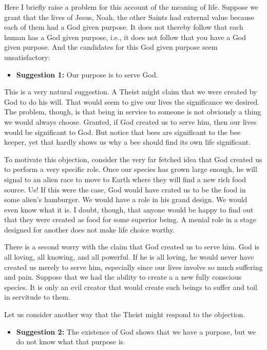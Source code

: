 \documentclass[]{article}
\begin{document}
Here I briefly raise a problem for this account of the meaning of life.
Suppose we grant that the lives of Jesus, Noah, the other Saints had
external value because each of them had a God given purpose. It does not
thereby follow that each human has a God given purpose, i.e., it does
not follow that you have a God given purpose. And the candidates for
this God given purpose seem unsatisfactory:

\begin{itemize}
\itemsep1pt\parskip0pt
\item
  \textbf{Suggestion 1:} Our purpose is to serve God.
\end{itemize}

This is a very natural suggestion. A Theist might claim that we were
created by God to do his will. That would seem to give our lives the
significance we desired. The problem, though, is that being in service
to someone is not obviously a thing we would always choose. Granted, if
God created us to serve him, then our lives would be significant to God.
But notice that bees are significant to the bee keeper, yet that hardly
shows us why a bee should find its own life significant.

To motivate this objection, consider the very far fetched idea that God
created us to perform a very specific role. Once our species has grown
large enough, he will signal to an alien race to move to Earth where
they will find a new rich food source. Us! If this were the case, God
would have crated us to be the food in some alien's hamburger. We would
have a role in his grand design. We would even know what it is. I doubt,
though, that anyone would be happy to find out that they were created as
food for some superior being. A menial role in a stage designed for
another does not make life choice worthy.

There is a second worry with the claim that God created us to serve him.
God is all loving, all knowing, and all powerful. If he is all loving,
he would never have created us merely to serve him, especially since our
lives involve so much suffering and pain. Suppose that we had the
ability to create a a new fully conscious species. It is only an evil
creator that would create such beings to suffer and toil in servitude to
them.

Let us consider another way that the Theist might respond to the
objection.

\begin{itemize}
\itemsep1pt\parskip0pt
\item
  \textbf{Suggestion 2:} The existence of God shows that we have a
  purpose, but we do not know what that purpose is.
\end{itemize}
\end{document}
